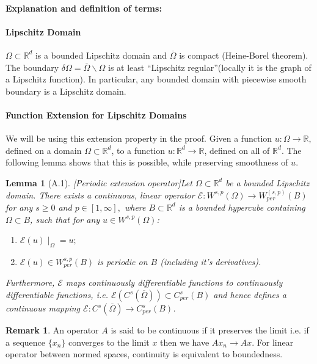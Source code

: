 \documentclass[reqno]{amsart}
\theoremstyle{plain}
\newtheorem{lem}{Lemma}
\theoremstyle{definition}
\newtheorem{rem}{Remark}
\newcommand{\bb}[1]{\mathbb{#1}}
\newcommand{\cal}[1]{\mathcal{#1}}
\begin{document}
\paragraph{\bf Explanation and definition of terms:}
\paragraph{\bf Lipschitz Domain}
$\Omega \subset \bb R^d$ is a bounded Lipschitz domain and $\overline{\Omega}$ is compact (Heine-Borel theorem). The boundary $\delta\Omega = \overline{\Omega}\backslash\Omega$ is at least ``Lipschitz regular''(locally it is the graph of a Lipschitz function). In particular, any bounded domain with piecewise smooth boundary is a Lipschitz domain.

\paragraph{\bf Function Extension for Lipschitz Domains}
We will be using this extension property in the proof. Given a function $u : \Omega \to \bb R$, defined on a domain $\Omega \subset \bb R^d$, to a function $u :\bb R^d \to \bb R$, defined on all of $\bb R^d$. The following lemma shows that this is possible, while preserving smoothness of $u$.
\begin{lem}[A.1][Periodic extension operator]\label{A.1}
    Let $\Omega \subset \bb R^d$ be a bounded Lipschitz domain. There exists a continuous, linear operator $\cal E : W^{s,p}(\Omega) \to W_{per}^(s,p)(B)$ for any $s \geq 0$ and $p \in [1,\infty],$ where $B \subset \bb R^d$ is a bounded hypercube containing $\Omega \subset B$, such that for any $u \in W^{s,p}(\Omega)$:
    \begin{enumerate}
        \item $\cal E(u)\mid_\Omega = u;$
        \item $\cal E(u) \in W^{s,p}_{per}(B)$ is periodic on $B$ (including it's derivatives).
    \end{enumerate}
    Furthermore, $\cal E$ maps continuously differentiable functions to continuously differentiable functions, i.e. $\cal E(C^s(\overline{\Omega})) \subset C^s_{per}(B)$ and hence defines a continuous mapping $\cal E: C^s(\overline{\Omega}) \to C^s_{per}(B)$.
\end{lem}
\begin{rem}
    An operator $A$ is said to be continuous if it preserves the limit i.e. if a sequence $\{x_n\}$ converges to the limit $x$ then we have $Ax_n \to Ax$. For linear operator between normed spaces, continuity is equivalent to boundedness.
\end{rem}
\end{document}
